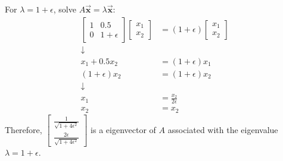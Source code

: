 \documentclass[letter, 11pt]{article}
\begin{document}
\begin{enumerate}[wide = 0pt, label = \textbf{Problem \arabic*:}]
\begin{subquestion}
			For $ \lambda = 1 + \epsilon $, solve $ A \vec{\bm{x}} = \lambda \vec{\bm{x}} $: 
			\begin{align*}
				\begin{bmatrix}
				1 & 0.5 \\
				0 & 1 + \epsilon
				\end{bmatrix}
				\begin{bmatrix}
				x_1 \\ x_2
				\end{bmatrix}
				&= 
				(1 + \epsilon)
				\begin{bmatrix}
				x_1 \\ x_2
				\end{bmatrix}
				\\ \downarrow \\
				x_1 + 0.5x_2 &= (1 + \epsilon) x_1 \\
				(1 + \epsilon) x_2 &= (1 + \epsilon) x_2 
				\\ \downarrow \\
				x_1 &= \frac{x_2}{2 \epsilon}\\
				x_2 &= x_2
			\end{align*}
			Therefore, $ \begin{bmatrix} \frac{1}{\sqrt{1 + 4 \epsilon^2}} \\ \frac{2 \epsilon}{\sqrt{1 + 4 \epsilon^2}} \end{bmatrix} $ is a eigenvector of $ A $ associated with the eigenvalue $ \lambda = 1 + \epsilon $. \\
			

\end{subquestion}
\end{enumerate}
\end{document}
